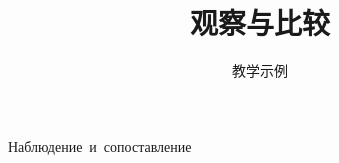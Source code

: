 \documentclass[UTF8,fontset=none,11pt]{ctexart}
\title{观察与比较}
\author{教学示例}
\date{}
\begin{document}
\maketitle
\begin{center}
\mbox{Наблюдение и сопоставление}
\end{center}


\end{document}
